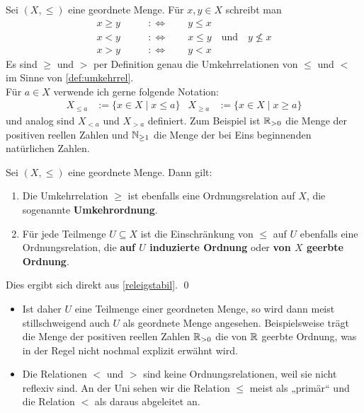 \begin{nota}
    Sei $(X,\le)$ eine geordnete Menge. Für $x,y\in X$ schreibt man
    \begin{align*}
        x \ge y \qquad &:\Leftrightarrow\qquad y \le x \\
        x < y \qquad &:\Leftrightarrow\qquad x\le y\quad \text{und}\quad y \not \le x \\
        x > y \qquad &:\Leftrightarrow\qquad y < x
    \end{align*}
    Es sind $\ge$ und $>$ per Definition genau die Umkehrrelationen von $\le$ und $<$ im Sinne von \cref{def:umkehrrel}. \\[0.5em]
    Für $a\in X$ verwende ich gerne folgende Notation:
    \begin{align*}
        X_{\le a} & := \{x\in X\mid x\le a\} & X_{\ge a} & := \{x\in X\mid x\ge a\}
    \end{align*}
    und analog sind $X_{<a}$ und $X_{>a}$ definiert. Zum Beispiel ist $\mathbb R_{>0}$ die Menge der positiven reellen Zahlen und $\mathbb N_{\ge 1}$ die Menge der bei Eins beginnenden natürlichen Zahlen.
\end{nota}


\begin{satz} \label{umkehrordnung}
    Sei $(X,\le)$ eine geordnete Menge. Dann gilt:
    \begin{enumerate}
        \item Die Umkehrrelation $\ge$ ist ebenfalls eine Ordnungsrelation auf $X$, die sogenannte \textbf{Umkehrordnung}.
        \item Für jede Teilmenge $U\subseteq X$ ist die Einschränkung von $\le$ auf $U$ ebenfalls eine Ordnungsrelation, die \textbf{auf $U$ induzierte Ordnung} oder \textbf{von $X$ geerbte Ordnung}.
    \end{enumerate}
\end{satz}


\begin{bew}
    Dies ergibt sich direkt aus \cref{releigstabil}. \qed
\end{bew}


\begin{bem} \quad
    \begin{itemize}
        \item Ist daher $U$ eine Teilmenge einer geordneten Menge, so wird dann meist stillschweigend auch $U$ als geordnete Menge angesehen. Beispielsweise trägt die Menge der positiven reellen Zahlen $\mathbb R_{>0}$ die von $\mathbb R$ geerbte Ordnung, was in der Regel nicht nochmal explizit erwähnt wird.
        \item Die Relationen $<$ und $>$ sind keine Ordnungsrelationen, weil sie nicht reflexiv sind. An der Uni sehen wir die Relation $\le$ meist als „primär“ und die Relation $<$ als daraus abgeleitet an.
    \end{itemize}
\end{bem}


